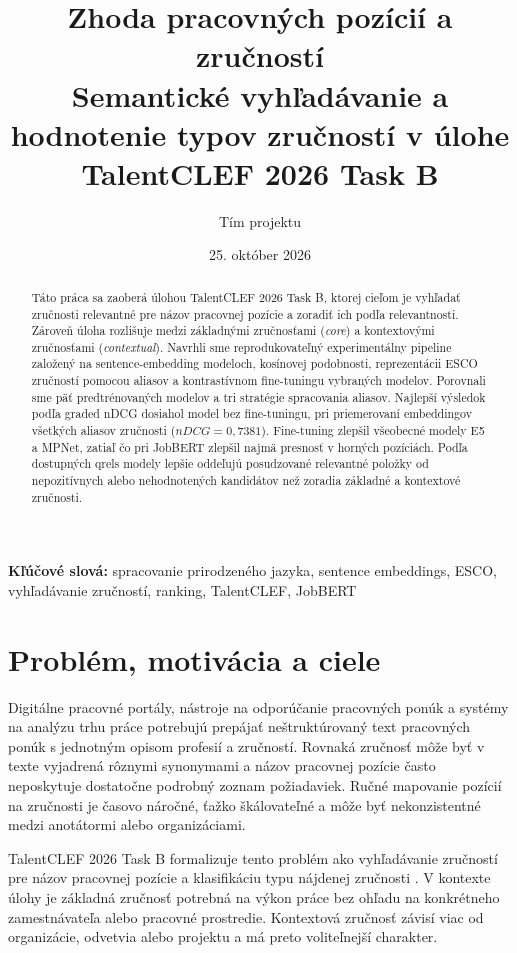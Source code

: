 \documentclass[12pt,a4paper]{article}
\title{\textbf{Zhoda pracovných pozícií a zručností}\\
\large Semantické vyhľadávanie a hodnotenie typov zručností v úlohe TalentCLEF 2026 Task B}
\author{Tím projektu}
\date{25. október 2026}
\newcommand{\model}[1]{\texttt{\detokenize{#1}}}
\begin{document}
\maketitle

\begin{abstract}
Táto práca sa zaoberá úlohou TalentCLEF 2026 Task B, ktorej cieľom je
vyhľadať zručnosti relevantné pre názov pracovnej pozície a zoradiť ich podľa
relevantnosti. Zároveň úloha rozlišuje medzi základnými zručnosťami
(\emph{core}) a kontextovými zručnosťami (\emph{contextual}). Navrhli sme
reprodukovateľný experimentálny pipeline založený na sentence-embedding
modeloch, kosínovej podobnosti, reprezentácii ESCO zručností pomocou aliasov
a kontrastívnom fine-tuningu vybraných modelov. Porovnali sme päť
predtrénovaných modelov a tri stratégie spracovania aliasov. Najlepší výsledok
podľa graded nDCG dosiahol model \model{TechWolf/JobBERT-v2} bez fine-tuningu,
pri priemerovaní embeddingov všetkých aliasov zručnosti
(\(nDCG=0{,}7381\)). Fine-tuning zlepšil všeobecné modely E5 a MPNet, zatiaľ
čo pri JobBERT zlepšil najmä presnosť v horných pozíciách. Podľa dostupných
qrels modely lepšie oddeľujú posudzované relevantné položky od
nepozitívnych alebo nehodnotených kandidátov než zoradia základné a
kontextové zručnosti.
\end{abstract}

\noindent\textbf{Kľúčové slová:} spracovanie prirodzeného jazyka, sentence
embeddings, ESCO, vyhľadávanie zručností, ranking, TalentCLEF, JobBERT

\section{Problém, motivácia a ciele}

Digitálne pracovné portály, nástroje na odporúčanie pracovných ponúk a systémy
na analýzu trhu práce potrebujú prepájať neštruktúrovaný text pracovných
ponúk s jednotným opisom profesií a zručností. Rovnaká zručnosť môže byť v
texte vyjadrená rôznymi synonymami a názov pracovnej pozície často neposkytuje
dostatočne podrobný zoznam požiadaviek. Ručné mapovanie pozícií na zručnosti je
časovo náročné, ťažko škálovateľné a môže byť nekonzistentné medzi anotátormi
alebo organizáciami.

TalentCLEF 2026 Task B formalizuje tento problém ako vyhľadávanie zručností
pre názov pracovnej pozície a klasifikáciu typu nájdenej zručnosti
\parencite{talentclef2026overviewb}. V kontexte úlohy je základná zručnosť
potrebná na výkon práce bez ohľadu na konkrétneho zamestnávateľa alebo
pracovné prostredie. Kontextová zručnosť závisí viac od organizácie, odvetvia
alebo projektu a má preto voliteľnejší charakter.
\end{document}

